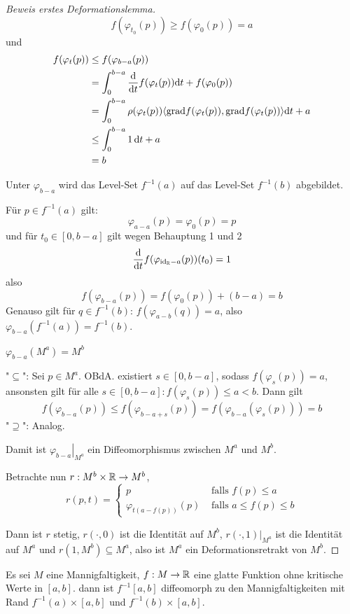 \begin{proof}[Beweis erstes Deformationslemma]
    \[ f(\varphi_{t_0}(p)) \geq f(\varphi_0(p)) = a \]
    und
    \begin{align*}
        f(\varphi_t(p)) 
        & \leq f(\varphi_{b-a}(p)) \\
        & = \int_0^{b-a}{ \frac{{ \operatorname{d} } }{{ \operatorname{d} } t} } f(\varphi_t(p)) { \operatorname{d} } t + f(\varphi_0(p)) \\
        & = \int_0^{b-a}\rho(\varphi_t(p)) \langle { \operatorname{grad} } f (\varphi_t(p)), { \operatorname{grad} } f (\varphi_t(p)) \rangle { \operatorname{d} } t + a \\
        & \leq \int_0^{b-a} 1 \, { \operatorname{d} } t + a \\
        & = b
    \end{align*}
    \sectiondone

     Unter $\varphi_{b-a}$ wird das Level-Set 
    $f^{-1}(a)$ auf das Level-Set $f^{-1}(b)$ abgebildet.
     
    Für $p \in f^{-1}(a)$ gilt:
    \[ \varphi_{a-a}(p) = \varphi_0(p) = p \]
    und für $t_0 \in [0, b - a]$ gilt wegen Behauptung 1 und 2
    \[ { \frac{{ \operatorname{d} } }{{ \operatorname{d} } t} }f(\varphi_{{ \operatorname{id} }_{{ \mathbb R }} - a}(p)) (t_0) = 1 \]
    also
    \[ f(\varphi_{b - a}(p)) = f(\varphi_{0}(p)) + (b - a) = b \]
    Genauso gilt für $q \in f^{-1}(b)$: $f(\varphi_{a - b}(q)) = a$, also 
    $\varphi_{b - a}(f^{-1}(a)) = f^{-1}(b)$.
    \sectiondone

     $\varphi_{b - a} (M^a) = M^b$

    "$\subseteq$": Sei $p \in M^a$. OBdA. existiert $s \in [0, b-a]$, sodass 
    $f(\varphi_s(p)) = a$, ansonsten gilt für alle 
    $s \in [0, b-a]: f(\varphi_s(p)) \leq a < b$. Dann gilt
    \[ f(\varphi_{b-a}(p)) \leq f(\varphi_{b-a+s}(p)) = f(\varphi_{b-a}(\varphi_s(p))) = b \] 
    "$\supseteq$": Analog.
    \sectiondone

    Damit ist $\left. \varphi_{b-a} \right\vert_{M^a}$ ein Diffeomorphismus zwischen
    $M^a$ und $M^b$. 

    Betrachte nun $r: M^b \times { \mathbb R } \to M^b$,
    \[  
        r(p, t) = \begin{cases}
            p & \text{ falls } f(p) \leq a \\
            \varphi_{t(a - f(p))}(p) & \text{ falls } a \leq f(p) \leq b 
        \end{cases}
    \]

    Dann ist $r$ stetig, $r(\cdot, 0)$ ist die Identität auf $M^b$, 
    $r(\cdot, 1)|_{M^a}$ ist die Identität auf $M^a$ und 
    $r(1, M^b) \subseteq M^a$, also ist $M^a$ ein Deformationsretrakt von $M^b$.

\end{proof}

\begin{corollary}
    Es sei $M$ eine Mannigfaltigkeit, $f: M \to { \mathbb R }$ eine glatte Funktion ohne
    kritische Werte in $[a, b]$. dann ist $f^{-1}[a, b]$ diffeomorph zu den
    Mannigfaltigkeiten mit Rand $f^{-1}(a) \times [a, b]$ und 
    $f^{-1}(b) \times [a, b]$.
\end{corollary}
